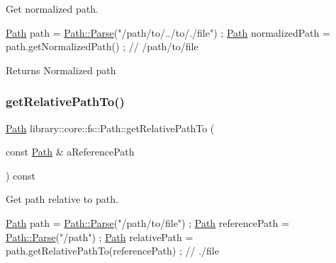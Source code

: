 Get normalized path. 


\begin{DoxyCode}
\hyperlink{classlibrary_1_1core_1_1fs_1_1_path_aabc4240fc08479d1bff6b9753f2b5cc2}{Path} path = \hyperlink{classlibrary_1_1core_1_1fs_1_1_path_a6ba644b6609507e724c217bf2020f5ae}{Path::Parse}(\textcolor{stringliteral}{"/path/to/../to/./file"}) ;
\hyperlink{classlibrary_1_1core_1_1fs_1_1_path_aabc4240fc08479d1bff6b9753f2b5cc2}{Path} normalizedPath = path.getNormalizedPath() ; \textcolor{comment}{// /path/to/file}
\end{DoxyCode}


\begin{DoxyReturn}{Returns}
Normalized path 
\end{DoxyReturn}
\mbox{\label{classlibrary_1_1core_1_1fs_1_1_path_a8f24340e887cfbfe675e96c0ba92321f}} 
\subsubsection{\texorpdfstring{get\+Relative\+Path\+To()}{getRelativePathTo()}}
{\footnotesize\ttfamily \hyperlink{classlibrary_1_1core_1_1fs_1_1_path}{Path} library\+::core\+::fs\+::\+Path\+::get\+Relative\+Path\+To (\begin{DoxyParamCaption}\item[{const \hyperlink{classlibrary_1_1core_1_1fs_1_1_path}{Path} \&}]{a\+Reference\+Path }\end{DoxyParamCaption}) const}



Get path relative to path. 


\begin{DoxyCode}
\hyperlink{classlibrary_1_1core_1_1fs_1_1_path_aabc4240fc08479d1bff6b9753f2b5cc2}{Path} path = \hyperlink{classlibrary_1_1core_1_1fs_1_1_path_a6ba644b6609507e724c217bf2020f5ae}{Path::Parse}(\textcolor{stringliteral}{"/path/to/file"}) ;
\hyperlink{classlibrary_1_1core_1_1fs_1_1_path_aabc4240fc08479d1bff6b9753f2b5cc2}{Path} referencePath = \hyperlink{classlibrary_1_1core_1_1fs_1_1_path_a6ba644b6609507e724c217bf2020f5ae}{Path::Parse}(\textcolor{stringliteral}{"/path"}) ;
\hyperlink{classlibrary_1_1core_1_1fs_1_1_path_aabc4240fc08479d1bff6b9753f2b5cc2}{Path} relativePath = path.getRelativePathTo(referencePath) ; \textcolor{comment}{// ./file}
\end{DoxyCode}




